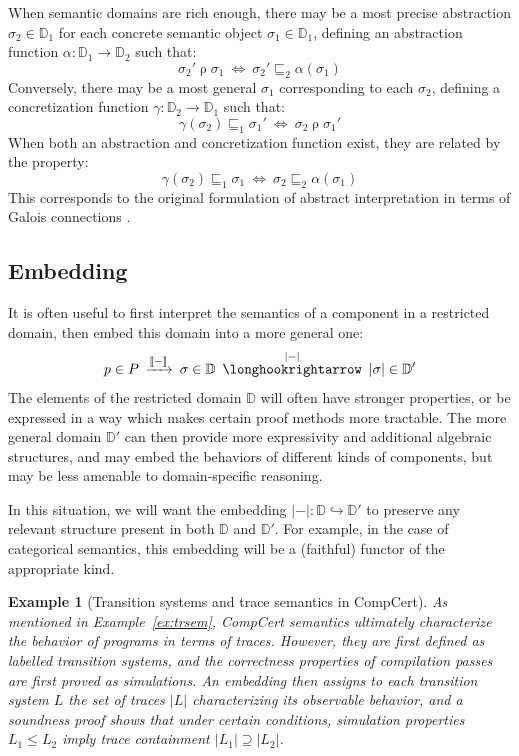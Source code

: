 \documentclass[11pt,oneside,draft]{book}
\newtheorem{example}[theorem]{Example}
\theoremstyle{definition}
\newcommand{\refby}{\sqsubseteq} %
\begin{document}
When semantic domains are rich enough,
there may be a most precise
abstraction $\sigma_2 \in \mathbb{D}_1$
for each concrete semantic object
$\sigma_1 \in \mathbb{D}_1$,
defining an abstraction function
$\alpha : \mathbb{D}_1 \rightarrow \mathbb{D}_2$
such that:
\[
  \sigma_2' \mathrel{\rho} \sigma_1
  \: \Leftrightarrow \:
  \sigma_2' \refby_2 \alpha(\sigma_1)
\]
Conversely,
there may be a most general $\sigma_1$
corresponding to each $\sigma_2$,
defining
a concretization function
$\gamma : \mathbb{D}_2 \rightarrow \mathbb{D}_1$
such that:
\[
  \gamma(\sigma_2) \refby_1 \sigma_1'
  \: \Leftrightarrow \:
  \sigma_2 \mathrel{\rho} \sigma_1'
\]
When both an abstraction and concretization function exist,
they are related by the property:
\[
  \gamma(\sigma_2) \refby_1 \sigma_1
  \: \Leftrightarrow \:
  \sigma_2 \refby_2 \alpha(\sigma_1)
\]
This corresponds to
the original formulation of abstract interpretation \citep{absint}
in terms of Galois connections \citep{pgc}.


\subsection{Embedding} \label{sec:bg:embed} %

It is often useful to first interpret the semantics of a component
in a restricted domain,
then embed this domain into a more general one:
\[
    p \in P
    \: \xrightarrow{\llbracket - \rrbracket} \:
    \sigma \in \mathbb{D}
    \: \stackrel{|-|}{\longhookrightarrow} \:
    |\sigma| \in \mathbb{D}'
\]
The elements of the restricted domain $\mathbb{D}$
will often have stronger properties,
or be expressed in a way which makes certain
proof methods more tractable.
The more general domain $\mathbb{D}'$
can then provide more expressivity
and additional algebraic structures,
and may embed the behaviors of different kinds of components,
but may be less amenable to domain-specific reasoning.

In this situation,
we will want the embedding
$|-| : \mathbb{D} \hookrightarrow \mathbb{D}'$
to preserve any relevant structure present in both
$\mathbb{D}$ and $\mathbb{D}'$.
For example,
in the case of categorical semantics,
this embedding will be a (faithful) functor
of the appropriate kind.

\begin{example}[Transition systems and trace semantics in CompCert] %
As mentioned in Example~\ref{ex:trsem},
CompCert semantics
ultimately characterize the behavior of programs
in terms of traces.
However,
they are first defined as labelled transition systems,
and the correctness properties of compilation passes
are first proved as simulations.
An embedding then assigns to each transition system $L$
the set of traces $|L|$ characterizing
its observable behavior,
and a soundness proof shows that
under certain conditions,
simulation properties $L_1 \le L_2$
imply trace containment $|L_1| \supseteq |L_2|$.
\end{example}
\end{document}
